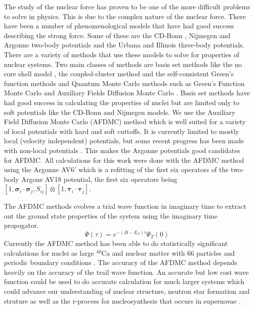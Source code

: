 \documentclass[12pt]{article}
\newcommand{\ti}{\bm{\tau}_i}
\newcommand{\tj}{\bm{\tau}_j}
\newcommand{\si}{\bm{\sigma}_i}
\newcommand{\sj}{\bm{\sigma}_j}
\begin{document}
The study of the nuclear force has proven to be one of the more difficult problems to solve in physics. This is due to the complex nature of the nuclear force. There have been a number of phenomenological models that have had good success describing the strong force. Some of these are the CD-Bonn \cite{machleidt2001}, Nijmegen \cite{nagels1975,stoks1994} and Argonne \cite{wiringa1995} two-body potentials and the Urbana \cite{pudliner1997} and Illinois \cite{pieper2001} three-body potentials. There are a variety of methods that use these models to solve for properties of nuclear systems. Two main classes of methods are basis set methods like the no core shell model \cite{navratil2009,barrett2013}, the coupled-cluster method \cite{hagen2014} and the self-consistent Green's function methods \cite{dickhoff2004,soma2014} and Quantum Monte Carlo methods such as Green's Function Monte Carlo and Auxiliary Fields Diffusion Monte Carlo \cite{carlson2015}. Basis set methods have had good success in calculating the properties of nuclei but are limited only to soft potentials like the CD-Bonn and Nijmegen models. We use the Auxiliary Field Diffusion Monte Carlo (AFDMC) method which is well suited for a variety of local potentials with hard and soft cuttoffs. It is currently limited to mostly local (velocity independent) potentials, but some recent progress has been made with non-local potentials \cite{lynn2012,roggero2014a,roggero2014b}. This makes the Argonne potentials good candidates for AFDMC. All calculations for this work were done with the AFDMC method using the Argonne AV6$'$ which is a refitting of the first six operators of the two-body Argone AV18 potential, the first six operators being $\left[1,\si\cdot\sj,S_{ij}\right]\otimes\left[1,\ti\cdot\tj\right]$.

The AFDMC methods evolves a trial wave function in imaginary time to extract out the ground state properties of the system using the imaginary time propogator. 
\begin{equation}
   \Psi(\tau) = e^{-(H-E_T)\tau}\Psi_T(0)
\end{equation}
Currently the AFDMC method has been able to do statistically significant calculations for nuclei as large $^{40}$Ca and nuclear matter with 66 particles and periodic boundary conditions \cite{carlson2015}. The accuracy of the AFDMC method depends heavily on the accuracy of the trail wave function. An accurate but low cost wave function could be used to do accurate calculation for much larger systems which could advance our understanding of nuclear structure, neutron star formation and struture as well as the r-process for nucleosynthesis that occurs in supernovae \cite{lattimer2001,lattimer2004,stone2003,douchin2001,heiselberg2000}.
\end{document}
